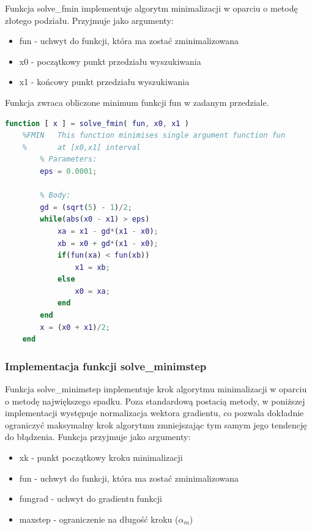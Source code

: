 \documentclass[12pt]{article}
\begin{document}
Funkcja solve\_fmin implementuje algorytm minimalizacji w oparciu o metodę
złotego podziału. Przyjmuje jako argumenty:

\begin{itemize}
  \item fun - uchwyt do funkcji, która ma zostać zminimalizowana
  \item x0 - początkowy punkt przedziału wyszukiwania
  \item x1 - końcowy punkt przedziału wyszukiwania
\end{itemize}

Funkcja zwraca obliczone minimum funkcji fun w zadanym przedziale.

\begin{lstlisting}[language=MATLAB, style=mystyle]
    function [ x ] = solve_fmin( fun, x0, x1 )
    %FMIN   This function minimises single argument function fun
    %       at [x0,x1] interval
        % Parameters:
        eps = 0.0001;
        
        % Body:
        gd = (sqrt(5) - 1)/2;
        while(abs(x0 - x1) > eps)
            xa = x1 - gd*(x1 - x0);
            xb = x0 + gd*(x1 - x0);
            if(fun(xa) < fun(xb))
                x1 = xb;
            else
                x0 = xa;
            end
        end
        x = (x0 + x1)/2;
    end
\end{lstlisting}

\newpage

\subsubsection*{Implementacja funkcji solve\_minimstep}

Funkcja solve\_minimstep implementuje krok algorytmu minimalizacji w oparciu o
metodę największego spadku. Poza standardową postacią metody, w poniższej
implementacji występuje normalizacja wektora gradientu, co pozwala dokładnie
ograniczyć maksymalny krok algorytmu zmniejszając tym samym jego tendencję
do błądzenia. Funkcja przyjmuje jako argumenty:

\begin{itemize}
  \item xk - punkt początkowy kroku minimalizacji
  \item fun - uchwyt do funkcji, która ma zostać zminimalizowana
  \item fungrad - uchwyt do gradientu funkcji
  \item maxstep - ograniczenie na długość kroku ($\alpha_{m}$)
\end{itemize}
\end{document}
